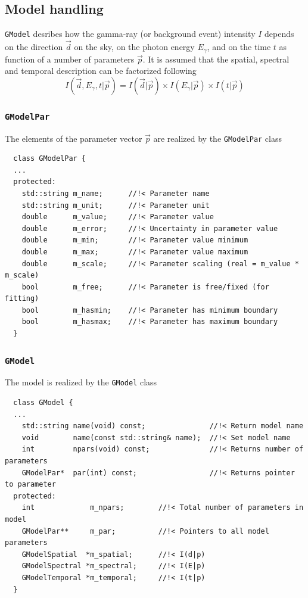 \documentclass{article}[12pt,a4]
\begin{document}
\subsection{Model handling}

{\tt GModel} desribes how the gamma-ray (or background event) intensity $I$ depends on 
the direction $\vec{d}$ on the sky, on the photon energy $E_{\gamma}$, and on the time 
$t$ as function of a number of parameters $\vec{p}$.
It is assumed that the spatial, spectral and temporal description can be factorized following
\begin{equation}
I(\vec{d},E_{\gamma},t | \vec{p}) = I(\vec{d} | \vec{p}) \times I(E_{\gamma} | \vec{p}) 
\times I(t | \vec{p}) 
\end{equation}


\subsubsection{{\tt GModelPar}}

The elements of the parameter vector $\vec{p}$ are realized by the {\tt GModelPar} class
\begin{verbatim}
  class GModelPar {
  ...
  protected:
    std::string m_name;      //!< Parameter name
    std::string m_unit;      //!< Parameter unit
    double      m_value;     //!< Parameter value
    double      m_error;     //!< Uncertainty in parameter value
    double      m_min;       //!< Parameter value minimum
    double      m_max;       //!< Parameter value maximum
    double      m_scale;     //!< Parameter scaling (real = m_value * m_scale)
    bool        m_free;      //!< Parameter is free/fixed (for fitting)
    bool        m_hasmin;    //!< Parameter has minimum boundary
    bool        m_hasmax;    //!< Parameter has maximum boundary
  }
\end{verbatim}


\subsubsection{{\tt GModel}}

The model is realized by the {\tt GModel} class
\begin{verbatim}
  class GModel {
  ...
    std::string name(void) const;               //!< Return model name
    void        name(const std::string& name);  //!< Set model name
    int         npars(void) const;              //!< Returns number of parameters
    GModelPar*  par(int) const;                 //!< Returns pointer to parameter
  protected:
    int             m_npars;        //!< Total number of parameters in model
    GModelPar**     m_par;          //!< Pointers to all model parameters
    GModelSpatial  *m_spatial;      //!< I(d|p)
    GModelSpectral *m_spectral;     //!< I(E|p)
    GModelTemporal *m_temporal;     //!< I(t|p)
  }
\end{verbatim}
\end{document}
